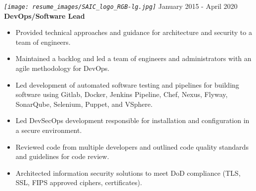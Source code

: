 \documentclass[12pt, line, margin]{res}
\begin{document}
\begin{resume}
            {\sl
              \texttt{[image: resume\_images/SAIC\_logo\_RGB-lg.jpg]}
            }
            \hfill January 2015 - April 2020 \\
            \textbf{DevOps/Software Lead}
            \begin{itemize}  \itemsep -2pt %
              \item   Provided technical approaches and guidance for architecture \newline
                          and security to a team of engineers.
              \item   Maintained a backlog and led a team of engineers and \newline
                          administrators with an agile methodology for DevOps.
              \item   Led development of automated software testing and pipelines \newline
                          for building software using Gitlab, Docker, Jenkins Pipeline, Chef,
                          Nexus, Flyway, SonarQube, Selenium, Puppet, and VSphere.
              \item   Led DevSecOps development responsible for installation and \newline
                          configuration in a secure environment.
              \item   Reviewed code from multiple developers and outlined code quality \newline
                          standards and guidelines for code review.
              \item   Architected information security solutions to meet DoD \newline
                          compliance (TLS, SSL, FIPS approved ciphers, certificates).
            \end{itemize}

            \pagebreak


\end{resume}
\end{document}
